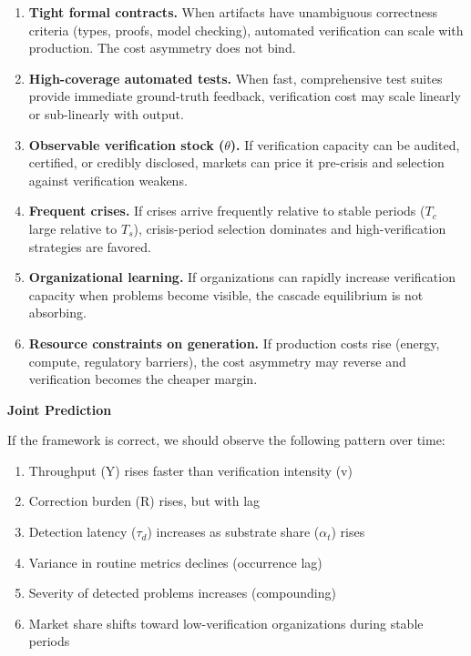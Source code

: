 \documentclass[11pt,a4paper]{article}
\providecommand{\tightlist}{\setlength{\itemsep}{0pt}\setlength{\parskip}{0pt}}
\begin{document}
\begin{enumerate}
\def\labelenumi{\arabic{enumi}.}
\tightlist
\item
  \textbf{Tight formal contracts.} When artifacts have unambiguous correctness criteria (types, proofs, model checking), automated verification can scale with production. The cost asymmetry does not bind.
\item
  \textbf{High-coverage automated tests.} When fast, comprehensive test suites provide immediate ground-truth feedback, verification cost may scale linearly or sub-linearly with output.
\item
  \textbf{Observable verification stock ($\theta$).} If verification capacity can be audited, certified, or credibly disclosed, markets can price it pre-crisis and selection against verification weakens.
\item
  \textbf{Frequent crises.} If crises arrive frequently relative to stable periods ($T_c$ large relative to $T_s$), crisis-period selection dominates and high-verification strategies are favored.
\item
  \textbf{Organizational learning.} If organizations can rapidly increase verification capacity when problems become visible, the cascade equilibrium is not absorbing.
\item
  \textbf{Resource constraints on generation.} If production costs rise (energy, compute, regulatory barriers), the cost asymmetry may reverse and verification becomes the cheaper margin.
\end{enumerate}

\textbf{Joint Prediction}

If the framework is correct, we should observe the following pattern over time:

\begin{enumerate}
\def\labelenumi{\arabic{enumi}.}
\tightlist
\item
  Throughput (Y) rises faster than verification intensity (v)
\item
  Correction burden (R) rises, but with lag
\item
  Detection latency ($\tau_{d}$) increases as substrate share ($\alpha_{t}$) rises
\item
  Variance in routine metrics declines (occurrence lag)
\item
  Severity of detected problems increases (compounding)
\item
  Market share shifts toward low-verification organizations during stable periods
\end{enumerate}
\end{document}
